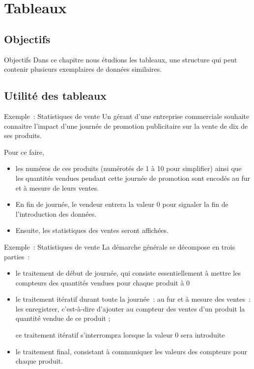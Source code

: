 \section{Tableaux}

\subsection{Objectifs}

\begin{frame}{Objectifs}
	Dans ce chapitre nous étudions les tableaux, 
	une structure qui peut contenir 
	plusieurs exemplaires de données similaires.
\end{frame}

\subsection{Utilité des tableaux}

\begin{frame}{Exemple~: Statistiques de vente}
	Un gérant d’une entreprise commerciale souhaite connaitre l’impact d’une
	journée de promotion publicitaire sur la vente de dix de ses produits.
	
	Pour ce faire, 
	\begin{itemize}
		\item
		les numéros de ces produits (numérotés de 1 à 10 pour
		simplifier) ainsi que les quantités vendues pendant cette journée de
		promotion sont encodés au fur et à mesure de leurs ventes. 
		\item
		En fin de	journée, le vendeur entrera la valeur 0 pour signaler la fin de
		l’introduction des données. 
		\item
		Ensuite, les statistiques des ventes seront	affichées.
	\end{itemize}
\end{frame}

\begin{frame}{Exemple~: Statistiques de vente}
	La démarche générale se décompose en trois parties~:

	\begin{itemize}
		\item {
		le traitement de début de journée, qui consiste essentiellement à mettre
		les compteurs des quantités vendues pour chaque produit à 0}
		\item {
		le traitement itératif durant toute la journée~: au fur et à mesure des
		ventes~: les enregistrer, c’est-à-dire d’ajouter au
		compteur des ventes d’un produit la quantité vendue de ce produit ;
		
		ce traitement itératif s’interrompra lorsque la valeur 0 sera introduite}
		\item {
		le traitement final, consistant à communiquer les valeurs des compteurs
		pour chaque produit.}
	\end{itemize}
\end{frame}

